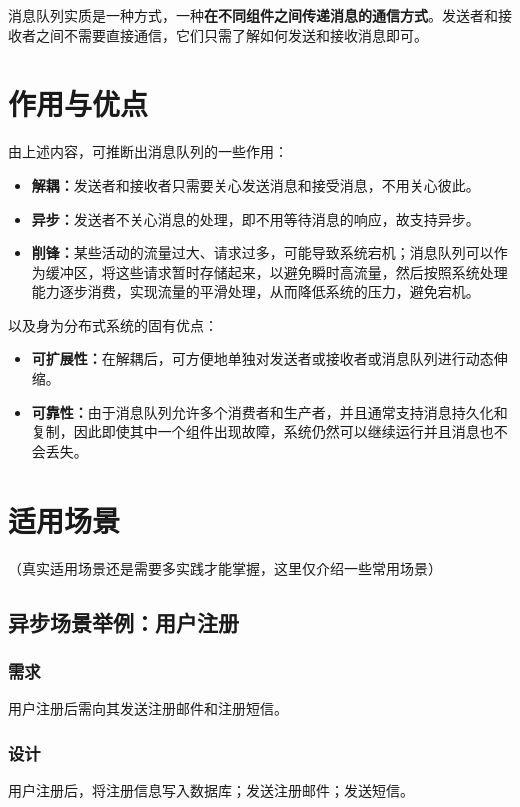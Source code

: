 \documentclass[11pt, a4paper, oneside, fontset=none]{ctexbook}
\begin{document}
消息队列实质是一种方式，一种{\bfseries\kaishu 在不同组件之间传递消息的通信方式}。发送者和接收者之间不需要直接通信，它们只需了解如何发送和接收消息即可。

\section{作用与优点}
由上述内容，可推断出消息队列的一些作用：
\begin{itemize}
  \item {\bfseries\kaishu 解耦：}发送者和接收者只需要关心发送消息和接受消息，不用关心彼此。
  \item {\bfseries\kaishu 异步：}发送者不关心消息的处理，即不用等待消息的响应，故支持异步。
  \item {\bfseries\kaishu 削锋：}某些活动的流量过大、请求过多，可能导致系统宕机；消息队列可以作为缓冲区，将这些请求暂时存储起来，以避免瞬时高流量，然后按照系统处理能力逐步消费，实现流量的平滑处理，从而降低系统的压力，避免宕机。
\end{itemize}

以及身为分布式系统的固有优点：
\begin{itemize}
  \item {\bfseries\kaishu 可扩展性：}在解耦后，可方便地单独对发送者或接收者或消息队列进行动态伸缩。
  \item {\bfseries\kaishu 可靠性：}由于消息队列允许多个消费者和生产者，并且通常支持消息持久化和复制，因此即使其中一个组件出现故障，系统仍然可以继续运行并且消息也不会丢失。
\end{itemize}

\section{适用场景}
（真实适用场景还是需要多实践才能掌握，这里仅介绍一些常用场景）
\subsection{异步场景举例：用户注册}
\subsubsection{需求}
用户注册后需向其发送注册邮件和注册短信。

\subsubsection{设计}
用户注册后，将注册信息写入数据库；发送注册邮件；发送短信。
\end{document}

